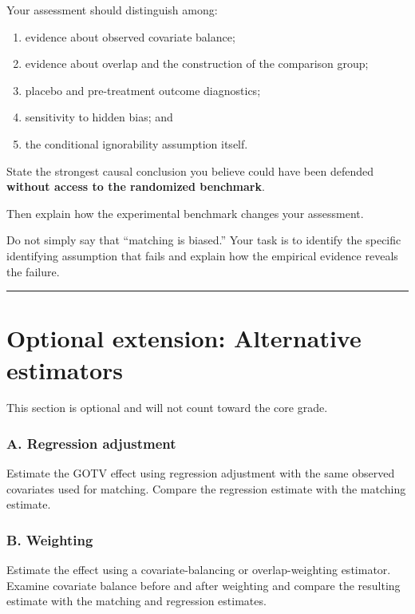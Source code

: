 \documentclass[
]{article}
\providecommand{\tightlist}{%
  \setlength{\itemsep}{0pt}\setlength{\parskip}{0pt}}
\begin{document}
Your assessment should distinguish among:

\begin{enumerate}
\def\labelenumi{\arabic{enumi}.}
\tightlist
\item
  evidence about observed covariate balance;
\item
  evidence about overlap and the construction of the comparison group;
\item
  placebo and pre-treatment outcome diagnostics;
\item
  sensitivity to hidden bias; and
\item
  the conditional ignorability assumption itself.
\end{enumerate}

State the strongest causal conclusion you believe could have been
defended \textbf{without access to the randomized benchmark}.

Then explain how the experimental benchmark changes your assessment.

Do not simply say that ``matching is biased.'' Your task is to identify
the specific identifying assumption that fails and explain how the
empirical evidence reveals the failure.

\begin{center}\rule{0.5\linewidth}{0.5pt}\end{center}

\section{Optional extension: Alternative
estimators}\label{optional-extension-alternative-estimators}

This section is optional and will not count toward the core grade.

\subsubsection{A. Regression adjustment}\label{a.-regression-adjustment}

Estimate the GOTV effect using regression adjustment with the same
observed covariates used for matching. Compare the regression estimate
with the matching estimate.

\subsubsection{B. Weighting}\label{b.-weighting}

Estimate the effect using a covariate-balancing or overlap-weighting
estimator. Examine covariate balance before and after weighting and
compare the resulting estimate with the matching and regression
estimates.
\end{document}
